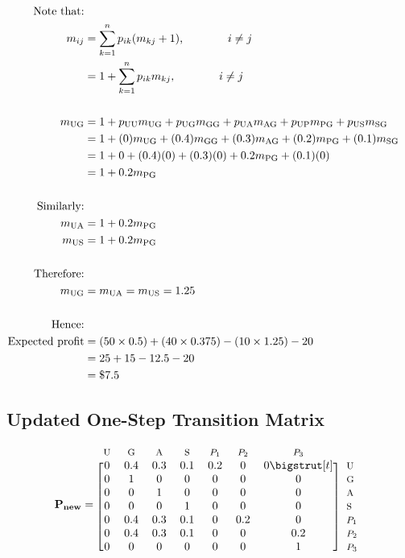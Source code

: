 \documentclass[12pt]{article}
\begin{document}
\begin{align*}
\text{Note that:}\\
m_{ij} & = \sum_{k=1}^{n} p_{ik}(m_{kj}+1) \text{,\qquad \qquad} i \neq j\\
& = 1 + \sum_{k=1}^{n} p_{ik}m_{kj} \text{,\qquad \qquad} i \neq j\\
& \\
m_{\text{UG}} &= 1 + p_{\text{UU}}m_{\text{UG}} + p_{\text{UG}}m_{\text{GG}} + p_{\text{UA}}m_{\text{AG}} + p_{\text{UP}}m_{\text{PG}} + p_{\text{US}}m_{\text{SG}}\\
&= 1 + (0)m_{\text{UG}} + (0.4)m_{\text{GG}} + (0.3)m_{\text{AG}} + (0.2)m_{\text{PG}} + (0.1)m_{\text{SG}}\\
& = 1 + 0 + (0.4)(0) + (0.3)(0) + 0.2m_{\text{PG}} + (0.1)(0)\\
& = 1 + 0.2m_{\text{PG}}\\
& \\
\text{Similarly:}\\
m_{\text{UA}} &= 1 + 0.2m_{\text{PG}}\\
m_{\text{US}} &= 1 + 0.2m_{\text{PG}}\\
& \\
\text{Therefore:}\\
m_{\text{UG}} &= m_{\text{UA}} = m_{\text{US}} = 1.25\\
& \\
\text{Hence:}\\
\text{Expected profit} & = (50\times0.5) + (40\times0.375) - (10\times1.25) - 20\\
& = 25 + 15 - 12.5 - 20\\
& = \$7.5
\end{align*}

\subsection{Updated One-Step Transition Matrix}
\begin{equation*}
	\mathbf{P_{new}}=
	\begin{blockarray}{*{7}{c} l}
	  \begin{block}{*{7}{>{$\footnotesize}c<{$}} l}
		U & G & A & S & $P_1$ & $P_2$ & $P_3$ & \\
	  \end{block}
	  \begin{block}{[*{7}{c}]>{$\footnotesize}l<{$}}
		0 & 0.4 & 0.3 & 0.1& 0.2 & 0 & 0\bigstrut[t]& U \\
		0 & 1 & 0 & 0 & 0 & 0 & 0 & G \\
		0 & 0 & 1 & 0 & 0 & 0 & 0 & A \\
		0 & 0 & 0 & 1 & 0 & 0 & 0 & S \\
		0 & 0.4 & 0.3 & 0.1 & 0 & 0.2 & 0 & $P_1$ \\
		0 & 0.4 & 0.3 & 0.1 & 0 & 0 & 0.2 & $P_2$ \\
		0 & 0 & 0 & 0 & 0 & 0 & 1 & $P_3$ \\
	  \end{block}
	\end{blockarray}
\end{equation*}
\end{document}

